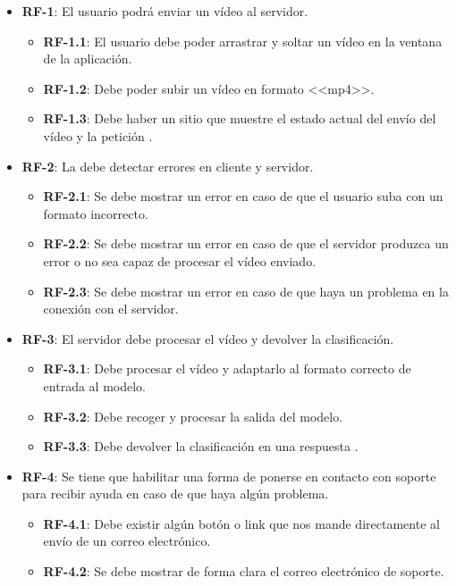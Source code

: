 \begin{itemize}
  \item \textbf{RF-1}: El usuario podrá enviar un vídeo al servidor.
        \begin{itemize}
          \item \textbf{RF-1.1}: El usuario debe poder arrastrar y soltar un vídeo en la ventana de la aplicación.
          \item \textbf{RF-1.2}: Debe poder subir un vídeo en formato <<mp4>>.
          \item \textbf{RF-1.3}: Debe haber un sitio que muestre el estado actual del envío del vídeo y la petición .
        \end{itemize}

  \item \textbf{RF-2}: La  debe detectar errores en cliente y servidor.
        \begin{itemize}
          \item \textbf{RF-2.1}: Se debe mostrar un error en caso de que el usuario suba con un formato incorrecto.
          \item \textbf{RF-2.2}: Se debe mostrar un error en caso de que el servidor produzca un error o no sea capaz de procesar el vídeo enviado.
          \item \textbf{RF-2.3}: Se debe mostrar un error en caso de que haya un problema en la conexión con el servidor.
        \end{itemize}

  \item \textbf{RF-3}: El servidor debe procesar el vídeo y devolver la clasificación.
        \begin{itemize}
          \item \textbf{RF-3.1}: Debe procesar el vídeo y adaptarlo al formato correcto de entrada al modelo.
          \item \textbf{RF-3.2}: Debe recoger y procesar la salida del modelo.
          \item \textbf{RF-3.3}: Debe devolver la clasificación en una respuesta .
        \end{itemize}

  \item \textbf{RF-4}: Se tiene que habilitar una forma de ponerse en contacto con soporte para recibir ayuda en caso de que haya algún problema.
        \begin{itemize}
          \item \textbf{RF-4.1}: Debe existir algún botón o link que nos mande directamente al envío de un correo electrónico.
          \item \textbf{RF-4.2}: Se debe mostrar de forma clara el correo electrónico de soporte.
        \end{itemize}


\end{itemize}
